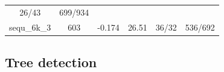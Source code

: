 \documentclass[twoside,12pt,final]{ucthesis-CA2012}
\begin{document}
\begin{ucmainmatter}
\begin{longtable}[]{@{}cccccc@{}}
\begin{minipage}[t]{0.18\columnwidth}
26/43\strut
\end{minipage} & \begin{minipage}[t]{0.22\columnwidth}\centering\strut
699/934\strut
\end{minipage}\tabularnewline
\begin{minipage}[t]{0.11\columnwidth}\centering\strut
sequ\_6k\_3\strut
\end{minipage} & \begin{minipage}[t]{0.07\columnwidth}\centering\strut
603\strut
\end{minipage} & \begin{minipage}[t]{0.11\columnwidth}\centering\strut
-0.174\strut
\end{minipage} & \begin{minipage}[t]{0.13\columnwidth}\centering\strut
26.51\strut
\end{minipage} & \begin{minipage}[t]{0.18\columnwidth}\centering\strut
36/32\strut
\end{minipage} & \begin{minipage}[t]{0.22\columnwidth}\centering\strut
536/692\strut
\end{minipage}\tabularnewline
\bottomrule
\end{longtable}
\subsection{Tree detection}\label{tree-detection-1}


\end{ucmainmatter}
\end{document}
